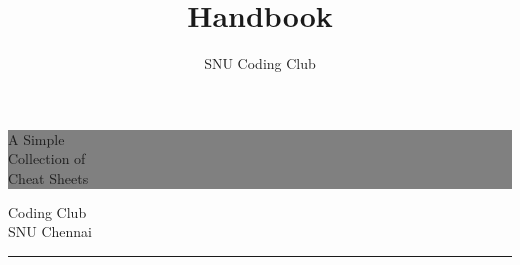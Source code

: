 \documentclass[11pt,a4paper]{book}
\title{Handbook}
\author{SNU Coding Club}
\begin{document}

\begin{titlepage} %


	\colorbox{grey}{
		\parbox[t]{0.93\textwidth}{ %
			\parbox[t]{0.91\textwidth}{ %
				\raggedleft %
				\fontsize{50pt}{80pt}\selectfont %
				\vspace{0.7cm} %

				A Simple\\
				Collection of\\
				Cheat Sheets\\

				\vspace{0.7cm} %
			}
		}
	}

	\vfill %


	\parbox[t]{0.93\textwidth}{ %
		\raggedleft %
		\large %
		{\Large Coding Club}\\[4pt] %
		SNU Chennai\\

		\hfill\rule{0.2\linewidth}{1pt}%
	}

\end{titlepage}
\tableofcontents
\end{document}
